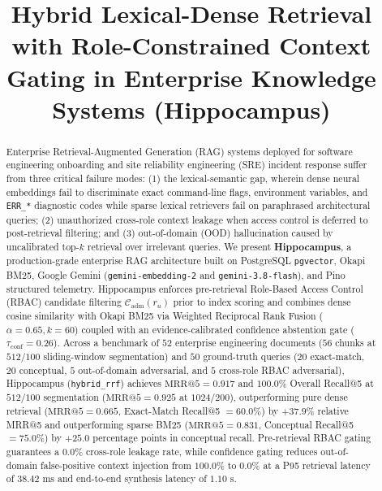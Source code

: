 \documentclass[conference]{IEEEtran}
\begin{document}
\title{Hybrid Lexical-Dense Retrieval with Role-Constrained Context Gating in Enterprise Knowledge Systems (Hippocampus)}

\author{
}

\maketitle

\begin{abstract}
Enterprise Retrieval-Augmented Generation (RAG) systems deployed for software engineering onboarding and site reliability engineering (SRE) incident response suffer from three critical failure modes: (1) the lexical-semantic gap, wherein dense neural embeddings fail to discriminate exact command-line flags, environment variables, and \texttt{ERR\_*} diagnostic codes while sparse lexical retrievers fail on paraphrased architectural queries; (2) unauthorized cross-role context leakage when access control is deferred to post-retrieval filtering; and (3) out-of-domain (OOD) hallucination caused by uncalibrated top-$k$ retrieval over irrelevant queries. We present \textbf{Hippocampus}, a production-grade enterprise RAG architecture built on PostgreSQL \texttt{pgvector}, Okapi BM25, Google Gemini (\texttt{gemini-embedding-2} and \texttt{gemini-3.8-flash}), and Pino structured telemetry. Hippocampus enforces pre-retrieval Role-Based Access Control (RBAC) candidate filtering $\mathcal{C}_{\text{adm}}(r_u)$ prior to index scoring and combines dense cosine similarity with Okapi BM25 via Weighted Reciprocal Rank Fusion ($\alpha = 0.65, k = 60$) coupled with an evidence-calibrated confidence abstention gate ($\tau_{\text{conf}} = 0.26$). Across a benchmark of $52$ enterprise engineering documents ($56$ chunks at $512/100$ sliding-window segmentation) and $50$ ground-truth queries ($20$ exact-match, $20$ conceptual, $5$ out-of-domain adversarial, and $5$ cross-role RBAC adversarial), Hippocampus (\texttt{hybrid\_rrf}) achieves $\text{MRR@5} = 0.917$ and $100.0\%$ Overall Recall@5 at $512/100$ segmentation ($\text{MRR@5} = 0.925$ at $1024/200$), outperforming pure dense retrieval ($\text{MRR@5} = 0.665$, Exact-Match Recall@5 $= 60.0\%$) by $+37.9\%$ relative MRR@5 and outperforming sparse BM25 ($\text{MRR@5} = 0.831$, Conceptual Recall@5 $= 75.0\%$) by $+25.0$ percentage points in conceptual recall. Pre-retrieval RBAC gating guarantees a $0.0\%$ cross-role leakage rate, while confidence gating reduces out-of-domain false-positive context injection from $100.0\%$ to $0.0\%$ at a P95 retrieval latency of $38.42\text{ ms}$ and end-to-end synthesis latency of $1.10\text{ s}$.
\end{abstract}
\end{document}
